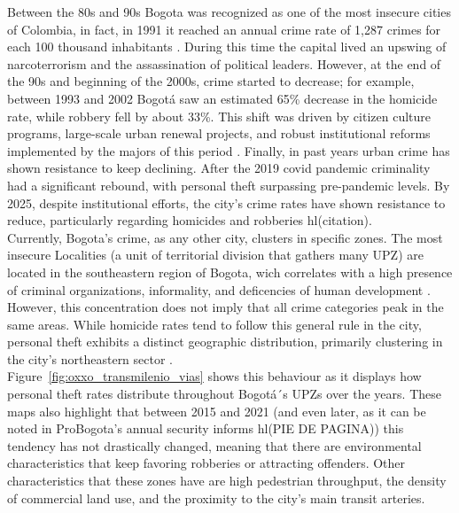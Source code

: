 \documentclass[12pt]{article}
\begin{document}
Between the 80s and 90s Bogota was recognized as one of the most insecure cities of Colombia, in fact, in 1991 it reached an annual crime rate of 1,287 crimes for each 100 thousand inhabitants \parencite{rodriguez2017ciudad}. 
During this time the capital lived an upswing of narcoterrorism and the assassination of political leaders. However, at the end of the 90s and beginning of the 2000s, crime started to decrease; for example, between 1993 and 2002 Bogotá saw an estimated 65\% decrease in the homicide rate, while robbery fell by about 33\%. 
This shift was driven by citizen culture programs, large-scale urban renewal projects, and robust institutional reforms implemented by the majors of this period \parencite{Sanchez2003, mockus2012building}. 
Finally, in past years urban crime has shown resistance to keep declining. After the 2019 covid pandemic criminality had a significant rebound, with personal theft surpassing pre-pandemic levels. By 2025, despite institutional efforts, the city's crime rates have shown resistance to reduce, particularly regarding homicides and robberies hl{(citation)}.\\

Currently, Bogota’s crime, as any other city, clusters in specific zones. 
The most insecure Localities (a unit of territorial division that gathers many UPZ) are located in the southeastern region of Bogota, wich correlates with a high presence of criminal organizations, informality, and deficencies of human development \parencite{probogota2024indice}. 
However, this concentration does not imply that all crime categories peak in the same areas. 
While homicide rates tend to follow this general rule in the city, personal theft exhibits a distinct geographic distribution, primarily clustering in the city's northeastern sector \parencite{probogota2022informe}.\\ 

Figure~\ref{fig:oxxo_transmilenio_vias} shows this behaviour as it displays how personal theft rates distribute throughout Bogotá´s UPZs over the years. 
These maps also highlight that between 2015 and 2021 (and even later, as it can be noted in ProBogota’s annual security informs hl{(PIE DE PAGINA)}) this tendency has not drastically changed, meaning that there are environmental characteristics that keep favoring robberies or attracting offenders. 
Other characteristics that these zones have are high pedestrian throughput, the density of commercial land use, and the proximity to the city's main transit arteries.\\ 
\end{document}
